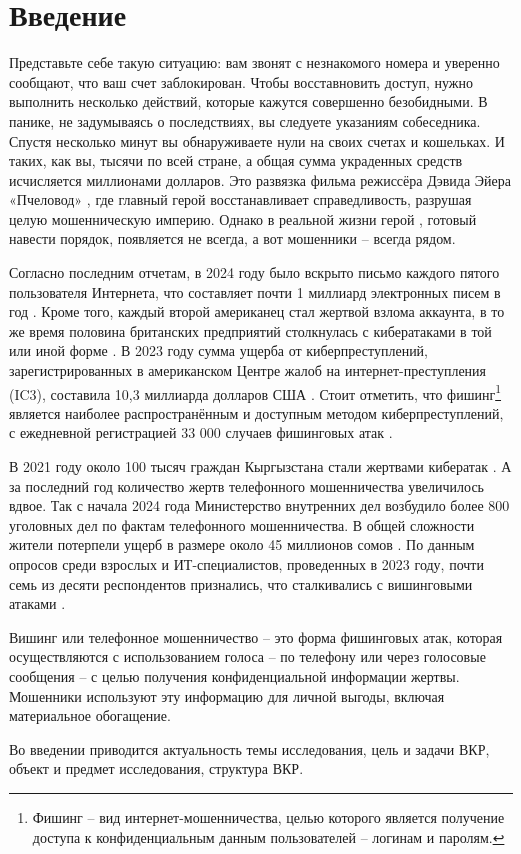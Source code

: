\section*{\centering Введение}

Представьте себе такую ситуацию: вам звонят с незнакомого номера и уверенно сообщают, что ваш счет заблокирован. Чтобы восставновить доступ, нужно выполнить несколько действий, которые кажутся совершенно безобидными. В панике, не задумываясь о последствиях, вы следуете указаниям собеседника. Спустя несколько минут вы обнаруживаете нули на своих счетах и кошельках. И таких, как вы, тысячи по всей стране, а общая сумма украденных средств исчисляется миллионами долларов. Это развязка фильма режиссёра Дэвида Эйера «Пчеловод» \cite{beekeeper2024}, где главный герой восстанавливает справедливость, разрушая целую мошенническую империю. Однако в реальной жизни герой \cite{fraud2024}, готовый навести порядок, появляется не всегда, а вот мошенники – всегда рядом.

Согласно последним отчетам, в 2024 году было вскрыто письмо каждого пятого пользователя Интернета, что составляет почти 1 миллиард электронных писем в год \cite{griffiths2024phishing}. Кроме того, каждый второй американец стал жертвой взлома аккаунта, в то же время половина британских предприятий столкнулась с кибератаками в той или иной форме \cite{griffiths2024cybercrime}. В 2023 году сумма ущерба от киберпреступлений, зарегистрированных в американском Центре жалоб на интернет-преступления (IC3), составила 10,3 миллиарда долларов США \cite{petrosyan2023}. Стоит отметить, что фишинг\footnote{Фишинг –  вид интернет-мошенничества, целью которого является получение доступа к конфиденциальным данным пользователей – логинам и паролям.} является наиболее распространённым и доступным методом киберпреступлений, с ежедневной регистрацией 33 000 случаев фишинговых атак \cite{lewis2018}. 

В 2021 году около 100 тысяч граждан Кыргызстана стали жертвами кибератак \cite{kopytin2023}. А за последний год количество жертв телефонного мошенничества увеличилось вдвое. Так с начала 2024 года Министерство внутренних дел возбудило более 800 уголовных дел по фактам телефонного мошенничества. В общей сложности жители потерпели ущерб в размере около 45 миллионов сомов \cite{amatbekova2024}. По данным опросов среди взрослых и ИТ-специалистов, проведенных в 2023 году, почти семь из десяти респондентов признались, что сталкивались с вишинговыми атаками \cite{petrosyan2024}.

Вишинг или телефонное мошенничество – это форма фишинговых атак, которая осуществляются с использованием голоса – по телефону или через голосовые сообщения – с целью получения конфиденциальной информации жертвы. Мошенники используют эту информацию для личной выгоды, включая материальное обогащение.

Во введении приводится актуальность темы исследования, цель и задачи ВКР, объект и предмет исследования, структура ВКР.

\newpage